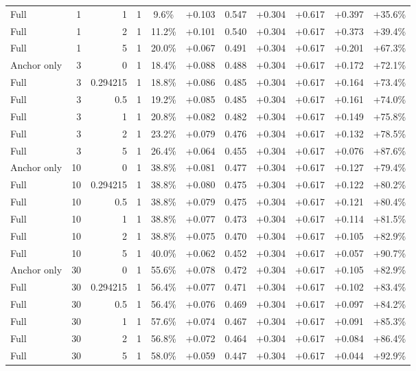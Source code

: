 \begin{table}[htbp]
\begin{tabular}{lrrrccccccc}
Full & 1 & 1 & 1 & 9.6\% & +0.103 & 0.547 & +0.304 & +0.617 & +0.397 & +35.6\% \\
Full & 1 & 2 & 1 & 11.2\% & +0.101 & 0.540 & +0.304 & +0.617 & +0.373 & +39.4\% \\
Full & 1 & 5 & 1 & 20.0\% & +0.067 & 0.491 & +0.304 & +0.617 & +0.201 & +67.3\% \\
Anchor only & 3 & 0 & 1 & 18.4\% & +0.088 & 0.488 & +0.304 & +0.617 & +0.172 & +72.1\% \\
Full & 3 & 0.294215 & 1 & 18.8\% & +0.086 & 0.485 & +0.304 & +0.617 & +0.164 & +73.4\% \\
Full & 3 & 0.5 & 1 & 19.2\% & +0.085 & 0.485 & +0.304 & +0.617 & +0.161 & +74.0\% \\
Full & 3 & 1 & 1 & 20.8\% & +0.082 & 0.482 & +0.304 & +0.617 & +0.149 & +75.8\% \\
Full & 3 & 2 & 1 & 23.2\% & +0.079 & 0.476 & +0.304 & +0.617 & +0.132 & +78.5\% \\
Full & 3 & 5 & 1 & 26.4\% & +0.064 & 0.455 & +0.304 & +0.617 & +0.076 & +87.6\% \\
Anchor only & 10 & 0 & 1 & 38.8\% & +0.081 & 0.477 & +0.304 & +0.617 & +0.127 & +79.4\% \\
Full & 10 & 0.294215 & 1 & 38.8\% & +0.080 & 0.475 & +0.304 & +0.617 & +0.122 & +80.2\% \\
Full & 10 & 0.5 & 1 & 38.8\% & +0.079 & 0.475 & +0.304 & +0.617 & +0.121 & +80.4\% \\
Full & 10 & 1 & 1 & 38.8\% & +0.077 & 0.473 & +0.304 & +0.617 & +0.114 & +81.5\% \\
Full & 10 & 2 & 1 & 38.8\% & +0.075 & 0.470 & +0.304 & +0.617 & +0.105 & +82.9\% \\
Full & 10 & 5 & 1 & 40.0\% & +0.062 & 0.452 & +0.304 & +0.617 & +0.057 & +90.7\% \\
Anchor only & 30 & 0 & 1 & 55.6\% & +0.078 & 0.472 & +0.304 & +0.617 & +0.105 & +82.9\% \\
Full & 30 & 0.294215 & 1 & 56.4\% & +0.077 & 0.471 & +0.304 & +0.617 & +0.102 & +83.4\% \\
Full & 30 & 0.5 & 1 & 56.4\% & +0.076 & 0.469 & +0.304 & +0.617 & +0.097 & +84.2\% \\
Full & 30 & 1 & 1 & 57.6\% & +0.074 & 0.467 & +0.304 & +0.617 & +0.091 & +85.3\% \\
Full & 30 & 2 & 1 & 56.8\% & +0.072 & 0.464 & +0.304 & +0.617 & +0.084 & +86.4\% \\
Full & 30 & 5 & 1 & 58.0\% & +0.059 & 0.447 & +0.304 & +0.617 & +0.044 & +92.9\% \\

\end{tabular}
\end{table}
